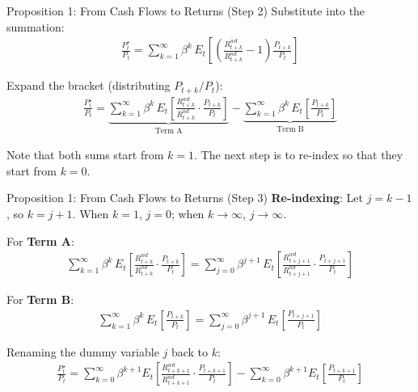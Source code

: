 \documentclass{beamer}
\begin{document}
\begin{frame}{Proposition 1: From Cash Flows to Returns (Step 2)}
	Substitute into the summation:
	\begin{align*}
		\frac{P_t^\star}{P_t} = \sum_{k=1}^{\infty} \beta^k \, E_t\!\left[\left(\frac{R_{t+k}^{wd}}{R_{t+k}^{nd}} - 1\right) \frac{P_{t+k}}{P_t}\right]
	\end{align*}

	Expand the bracket (distributing $P_{t+k}/P_t$):
	\begin{align*}
		\frac{P_t^\star}{P_t} = \underbrace{\sum_{k=1}^{\infty} \beta^k \, E_t\!\left[\frac{R_{t+k}^{wd}}{R_{t+k}^{nd}} \cdot \frac{P_{t+k}}{P_t}\right]}_{\text{Term A}} - \underbrace{\sum_{k=1}^{\infty} \beta^k \, E_t\!\left[\frac{P_{t+k}}{P_t}\right]}_{\text{Term B}}
	\end{align*}

	Note that both sums start from $k = 1$. The next step is to re-index so that they start from $k = 0$.
\end{frame}

\begin{frame}{Proposition 1: From Cash Flows to Returns (Step 3)}
	\textbf{Re-indexing}: Let $j = k - 1$, so $k = j + 1$. When $k = 1$, $j = 0$; when $k \to \infty$, $j \to \infty$.

	\vspace{5pt}
	For \textbf{Term A}:
	\begin{align*}
		\sum_{k=1}^{\infty} \beta^k \, E_t\!\left[\frac{R_{t+k}^{wd}}{R_{t+k}^{nd}} \cdot \frac{P_{t+k}}{P_t}\right] = \sum_{j=0}^{\infty} \beta^{j+1} \, E_t\!\left[\frac{R_{t+j+1}^{wd}}{R_{t+j+1}^{nd}} \cdot \frac{P_{t+j+1}}{P_t}\right]
	\end{align*}

	For \textbf{Term B}:
	\begin{align*}
		\sum_{k=1}^{\infty} \beta^k \, E_t\!\left[\frac{P_{t+k}}{P_t}\right] = \sum_{j=0}^{\infty} \beta^{j+1} \, E_t\!\left[\frac{P_{t+j+1}}{P_t}\right]
	\end{align*}

	Renaming the dummy variable $j$ back to $k$:
	\begin{align*}
		\boxed{\frac{P_t^\star}{P_t} = \sum_{k=0}^{\infty} \beta^{k+1} E_t\!\left[\frac{R_{t+k+1}^{wd}}{R_{t+k+1}^{nd}} \cdot \frac{P_{t+k+1}}{P_t}\right] - \sum_{k=0}^{\infty} \beta^{k+1} E_t\!\left[\frac{P_{t+k+1}}{P_t}\right]}
	\end{align*}
\end{frame}
\end{document}

